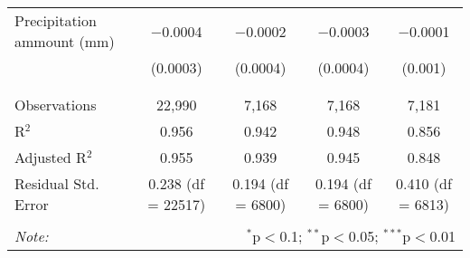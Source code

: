 \begin{tabular}{@{\extracolsep{5pt}}lcccc}
 Precipitation ammount (mm) & $-$0.0004 & $-$0.0002 & $-$0.0003 & $-$0.0001 \\ 
  & (0.0003) & (0.0004) & (0.0004) & (0.001) \\ 
  & & & & \\ 
\hline \\[-1.8ex] 
Observations & 22,990 & 7,168 & 7,168 & 7,181 \\ 
R$^{2}$ & 0.956 & 0.942 & 0.948 & 0.856 \\ 
Adjusted R$^{2}$ & 0.955 & 0.939 & 0.945 & 0.848 \\ 
Residual Std. Error & 0.238 (df = 22517) & 0.194 (df = 6800) & 0.194 (df = 6800) & 0.410 (df = 6813) \\ 
\hline 
\hline \\[-1.8ex] 
\textit{Note:}  & \multicolumn{4}{r}{$^{*}$p$<$0.1; $^{**}$p$<$0.05; $^{***}$p$<$0.01} \\ 
\end{tabular} 
